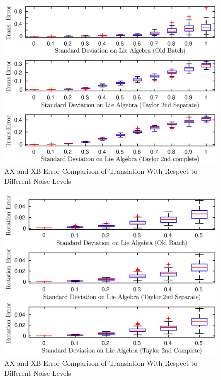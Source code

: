 \documentclass[twocolumn,10pt]{asme2ej}
\begin{document}
\begin{figure}[h]
\includegraphics[scale=0.6]{ax_xb_mean_trans_error_1_10.eps}
\caption{AX and XB Error Comparison of Translation With Respect to Different Noise Levels}
\centering
\label{taxxbconv}
\end{figure}

\begin{figure}[h]
\includegraphics[scale=0.6]{ax_xb_mean_rot_error_1_6.eps}
\caption{AX and XB Error Comparison of Translation With Respect to Different Noise Levels}
\centering
\end{figure}
\end{document}
